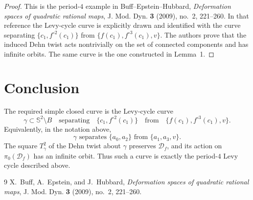 \documentclass[11pt]{amsart}
\theoremstyle{definition}
\theoremstyle{remark}
\begin{document}
\begin{proof}
This is the period-\(4\) example in Buff--Epstein--Hubbard,
\emph{Deformation spaces of quadratic rational maps},
J. Mod. Dyn. \textbf{3} (2009), no.~2, 221--260.  In that reference the
Levy-cycle curve is explicitly drawn and identified with the curve
separating \(\{c_1,f^{\circ 2}(c_1)\}\) from
\(\{f(c_1),f^{\circ 3}(c_1),v\}\).  The authors prove that the induced
Dehn twist acts nontrivially on the set of connected components and has
infinite orbits.  The same curve is the one constructed in Lemma~1.
\end{proof}

\section{Conclusion}

The required simple closed curve is the Levy-cycle curve
\[
\boxed{\gamma\subset \mathbb S^2\setminus B
\quad\text{separating}\quad
\{c_1,f^{\circ 2}(c_1)\}
\quad\text{from}\quad
\{f(c_1),f^{\circ 3}(c_1),v\}.}
\]
Equivalently, in the notation above,
\[
\gamma \text{ separates } \{a_0,a_2\}
\text{ from } \{a_1,a_3,v\}.
\]
The square \(T_\gamma^2\) of the Dehn twist about \(\gamma\) preserves
\(\mathcal D_f\), and its action on \(\pi_0(\mathcal D_f)\) has an infinite
orbit.  Thus such a curve is exactly the period-\(4\) Levy cycle described
above.

\begin{thebibliography}{9}
X.~Buff, A.~Epstein, and J.~Hubbard,
\emph{Deformation spaces of quadratic rational maps},
J. Mod. Dyn. \textbf{3} (2009), no.~2, 221--260.
\end{thebibliography}
\end{document}
